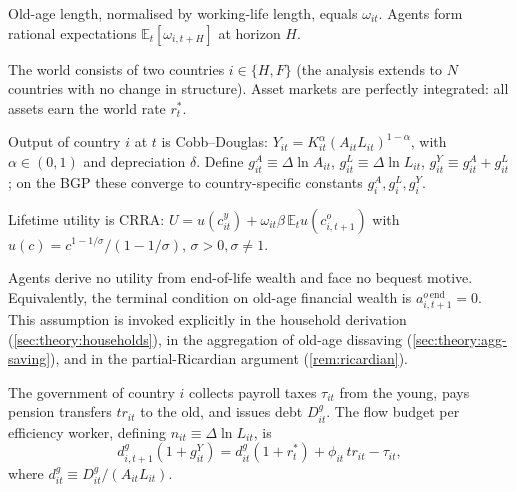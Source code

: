 \begin{assumption}\label{ass:A3}
Old-age length, normalised by working-life length, equals $\omega_{it}$.
Agents form rational expectations $\mathbb{E}_t[\omega_{i,t+H}]$ at horizon $H$.
\end{assumption}

\begin{assumption}\label{ass:A4}
The world consists of two countries $i\in\{H,F\}$ (the analysis extends to $N$
countries with no change in structure). Asset markets are perfectly integrated:
all assets earn the world rate $r_t^*$.
\end{assumption}

\begin{assumption}[Technology]\label{ass:A5}
Output of country $i$ at $t$ is Cobb--Douglas: $Y_{it}=K_{it}^{\alpha}
(A_{it}L_{it})^{1-\alpha}$, with $\alpha\in(0,1)$ and depreciation $\delta$.
Define $g_{it}^A\equiv \Delta \ln A_{it}$, $g_{it}^L\equiv \Delta\ln L_{it}$,
$g_{it}^Y\equiv g_{it}^A+g_{it}^L$; on the BGP these converge to country-specific
constants $g_i^A, g_i^L, g_i^Y$.
\end{assumption}

\begin{assumption}[Preferences]\label{ass:A6}
Lifetime utility is CRRA:
$U=u(c_{it}^y)+\omega_{it}\beta\,\mathbb{E}_t u(c_{i,t+1}^o)$ with
$u(c)=c^{1-1/\sigma}/(1-1/\sigma)$, $\sigma>0,\sigma\ne1$.
\end{assumption}

\begin{assumption}[No Bequests]\label{ass:A7}
Agents derive no utility from end-of-life wealth and face no bequest motive.
Equivalently, the terminal condition on old-age financial wealth is
$a_{i,t+1}^{o\,\text{end}}=0$. This assumption is invoked explicitly in the
household derivation (\cref{sec:theory:households}), in the aggregation of
old-age dissaving (\cref{sec:theory:agg-saving}), and in the partial-Ricardian
argument (\cref{rem:ricardian}).
\end{assumption}

\begin{assumption}\label{ass:A8}
The government of country $i$ collects payroll taxes $\tau_{it}$ from the
young, pays pension transfers $tr_{it}$ to the old, and issues debt $D_{it}^g$.
The flow budget per efficiency worker, defining $n_{it}\equiv\Delta\ln L_{it}$,
is
\begin{equation}
d_{i,t+1}^g(1+g_{it}^Y)=d_{it}^g(1+r_t^*)+\phi_{it}\,tr_{it}-\tau_{it},
\end{equation}
where $d_{it}^g\equiv D_{it}^g/(A_{it}L_{it})$.
\end{assumption}

